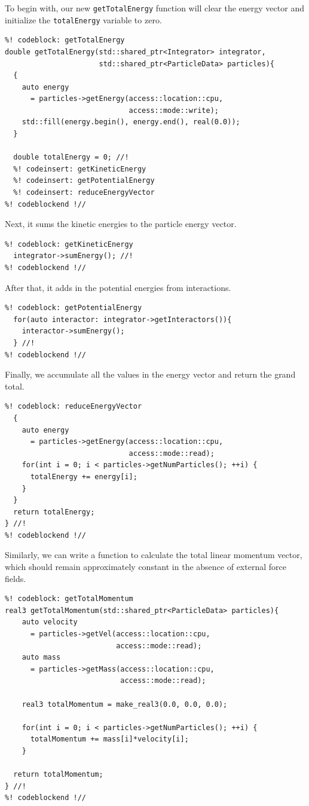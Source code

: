 To begin with, our new \texttt{getTotalEnergy} function will clear the energy 
vector and initialize the \texttt{totalEnergy} variable to zero.
\begin{lstlisting}
%! codeblock: getTotalEnergy
double getTotalEnergy(std::shared_ptr<Integrator> integrator,
                      std::shared_ptr<ParticleData> particles){
  {
    auto energy
      = particles->getEnergy(access::location::cpu,
                             access::mode::write);
    std::fill(energy.begin(), energy.end(), real(0.0));
  }

  double totalEnergy = 0; //!
  %! codeinsert: getKineticEnergy
  %! codeinsert: getPotentialEnergy
  %! codeinsert: reduceEnergyVector
%! codeblockend !//
\end{lstlisting}
Next, it sums the kinetic energies to the particle energy vector.
\begin{lstlisting}
%! codeblock: getKineticEnergy
  integrator->sumEnergy(); //!
%! codeblockend !//
\end{lstlisting}
After that, it adds in the potential energies from interactions.
\begin{lstlisting}
%! codeblock: getPotentialEnergy
  for(auto interactor: integrator->getInteractors()){
    interactor->sumEnergy();
  } //!
%! codeblockend !//
\end{lstlisting}
Finally, we accumulate all the values in the energy vector and return the grand 
total.
\begin{lstlisting}
%! codeblock: reduceEnergyVector
  {
    auto energy
      = particles->getEnergy(access::location::cpu,
                             access::mode::read);
    for(int i = 0; i < particles->getNumParticles(); ++i) {
      totalEnergy += energy[i];
    }
  }
  return totalEnergy;
} //!
%! codeblockend !//
\end{lstlisting}

Similarly, we can write a function to calculate the total linear momentum 
vector, which should remain approximately constant in the absence of external 
force fields.

\begin{lstlisting}
%! codeblock: getTotalMomentum
real3 getTotalMomentum(std::shared_ptr<ParticleData> particles){
    auto velocity
      = particles->getVel(access::location::cpu,
                          access::mode::read);
    auto mass
      = particles->getMass(access::location::cpu,
                           access::mode::read);

    real3 totalMomentum = make_real3(0.0, 0.0, 0.0);

    for(int i = 0; i < particles->getNumParticles(); ++i) {
      totalMomentum += mass[i]*velocity[i];
    }

  return totalMomentum;
} //!
%! codeblockend !//
\end{lstlisting}

